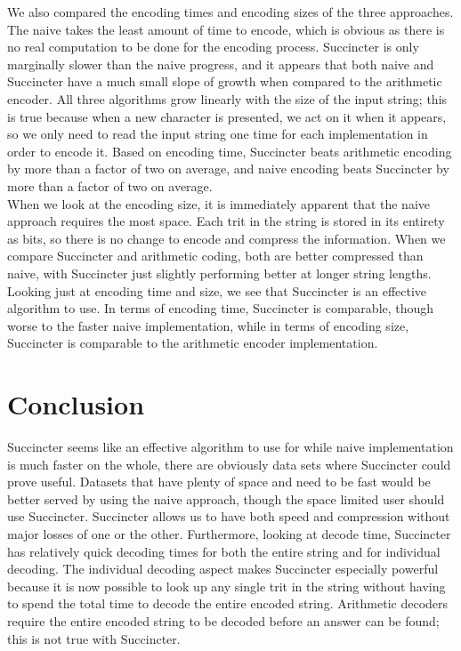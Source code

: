 \documentclass{article}
\begin{document}
We also compared the encoding times and encoding sizes of the three approaches. The naive takes the least amount of time to encode, which is obvious as there is no real computation to be done for the encoding process. Succincter is only marginally slower than the naive progress, and it appears that both naive and Succincter have a much small slope of growth when compared to the arithmetic encoder. All three algorithms grow linearly with the size of the input string; this is true because when a new character is presented, we act on it when it appears, so we only need to read the input string one time for each implementation in order to encode it. Based on encoding time, Succincter beats arithmetic encoding by more than a factor of two on average, and naive encoding beats Succincter by more than a factor of two on average.\\

When we look at the encoding size, it is immediately apparent that the naive approach requires the most space. Each trit in the string is stored in its entirety as bits, so there is no change to encode and compress the information. When we compare Succincter and arithmetic coding, both are better compressed than naive, with Succincter just slightly performing better at longer string lengths. \\

Looking just at encoding time and size, we see that Succincter is an effective algorithm to use. In terms of encoding time, Succincter is comparable, though worse to the faster naive implementation, while in terms of encoding size, Succincter is comparable to the arithmetic encoder implementation. \\

\noindent \section{Conclusion}

Succincter seems like an effective algorithm to use for while naive implementation is much faster on the whole, there are obviously data sets where Succincter could prove useful. Datasets that have plenty of space and need to be fast would be better served by using the naive approach, though the space limited user should use Succincter. Succincter allows us to have both speed and compression without major losses of one or the other. Furthermore, looking at decode time, Succincter has relatively quick decoding times for both the entire string and for individual decoding. The individual decoding aspect makes Succincter especially powerful because it is now possible to look up any single trit in the string without having to spend the total time to decode the entire encoded string. Arithmetic decoders require the entire encoded string to be decoded before an answer can be found; this is not true with Succincter.\\
\end{document}
